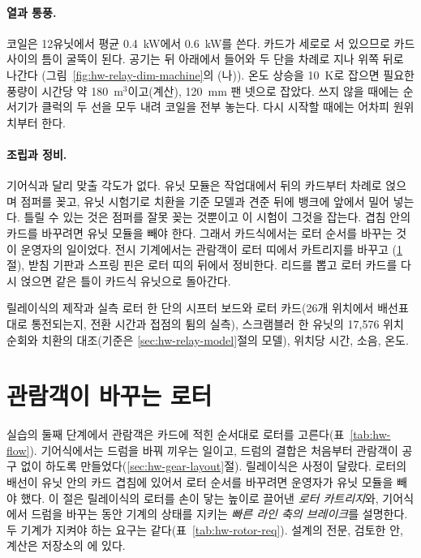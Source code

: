 \paragraph{열과 통풍.} 코일은 12유닛에서 평균 0.4~kW에서 0.6~kW를 쓴다. 카드가 세로로 서 있으므로 카드 사이의
틈이 굴뚝이 된다. 공기는 뒤 아래에서 들어와 두 단을 차례로 지나 위쪽 뒤로 나간다
(그림~\ref{fig:hw-relay-dim-machine}의 (나)). 온도 상승을
10~K로 잡으면 필요한 풍량이 시간당 약 180~m$^3$이고(계산), 120~mm 팬 넷으로 잡았다. 쓰지 않을 때에는 순서기가
클럭의 두 선을 모두 내려 코일을 전부 놓는다. 다시 시작할 때에는 어차피 원위치부터 한다.

\paragraph{조립과 정비.} 기어식과 달리 맞출 각도가 없다. 유닛 모듈은 작업대에서 뒤의 카드부터 차례로 얹으며
점퍼를 꽂고, 유닛 시험기로 치환을 기준 모델과 견준 뒤에 뱅크에 앞에서 밀어 넣는다. 틀릴 수 있는 것은 점퍼를
잘못 꽂는 것뿐이고 이 시험이 그것을 잡는다. 겹침 안의 카드를 바꾸려면 유닛 모듈을 빼야 한다. 그래서 카드식에서는
로터 순서를 바꾸는 것이 운영자의 일이었다. 전시 기계에서는 관람객이 로터 띠에서 카트리지를 바꾸고
(\ref{sec:hw-rotor-change}절), 받침 기판과 스프링 핀은 로터 띠의 뒤에서 정비한다. 리드를 뽑고 로터 카드를 다시
얹으면 같은 틀이 카드식 유닛으로 돌아간다.

\begin{todobox}{릴레이식의 제작과 실측}
로터 한 단의 시프터 보드와 로터 카드(26개 위치에서 배선표대로 통전되는지, 전환 시간과 접점의 튐의 실측),
스크램블러 한 유닛의 17,576 위치 순회와 치환의 대조(기준은 \ref{sec:hw-relay-model}절의 모델), 위치당 시간,
소음, 온도.
\end{todobox}

\section{관람객이 바꾸는 로터}\label{sec:hw-rotor-change}

실습의 둘째 단계에서 관람객은 카드에 적힌 순서대로 로터를 고른다(표~\ref{tab:hw-flow}). 기어식에서는 드럼을 바꿔
끼우는 일이고, 드럼의 결합은 처음부터 관람객이 공구 없이 하도록 만들었다(\ref{sec:hw-gear-layout}절). 릴레이식은
사정이 달랐다. 로터의 배선이 유닛 안의 카드 겹침에 있어서 로터 순서를 바꾸려면 운영자가 유닛 모듈을 빼야 했다.
이 절은 릴레이식의 로터를 손이 닿는 높이로 끌어낸 \emph{로터 카트리지}와, 기어식에서 드럼을 바꾸는 동안 기계의
상태를 지키는 \emph{빠른 라인 축의 브레이크}를 설명한다. 두 기계가 지켜야 하는 요구는 같다(표~\ref{tab:hw-rotor-req}).
설계의 전문, 검토한 안, 계산은 저장소의 에 있다.

